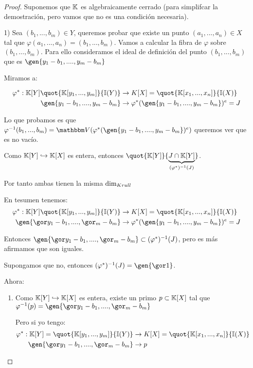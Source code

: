 \begin{proof}
	Suponemos que $\mathbb{K}$ es algebraicamente cerrado (para simplifcar la demostración, pero vamos que no es una condición necesaria).
	
	1) Sea $(b_1,...,b_m) \in Y$, queremos probar que existe un punto $(a_1,...,a_n) \in X$ tal que $\varphi(a_1,...,a_n)=(b_1,...,b_m)$. Vamos a calcular la fibra de $\varphi$ sobre $(b_1,...,b_m)$. Para ello consideramos el ideal de definición del punto $(b_1,...,b_m)$ que es $\gen{y_1-b_1,....,y_m-b_m}$
	
	Miramos a:
	
	\begin{align*}
		\varphi^*: \K[Y]  \quot{\K[y_1,...,y_m]}{\I(Y)}& \rightarrow K[X] = \quot{\K[x_1,...,x_n]}{\I(X)} \\
		\gen{y_1-b_1,....,y_m-b_m} & \rightarrow \varphi^*(\gen{y_1-b_1,....,y_m-b_m})^e=J
	\end{align*}
	
	Lo que probamos es que $\varphi^{-1}(b_1,...,b_m)= \V(\varphi^*(\gen{y_1-b_1,....,y_m-b_m})^e)$ queremos ver que es no vacío.
	
	Como $\mathbb{K}[Y] \hookrightarrow \mathbb{K}[X]$ es entera, entonces $\quot{\K[Y]}{\underbrace{J \cap \K[Y]}_{(\varphi^*)^{-1}(J)}}$.
	
	Por tanto ambas tienen la misma $\dim_{Krull}$
	
	En tesumen tenemos:
	\begin{align*}
		\varphi^*: \K[Y]  \quot{\K[y_1,...,y_m]}{\I(Y)}& \rightarrow K[X] = \quot{\K[x_1,...,x_n]}{\I(X)} \\
		\gen{\cls{y_1-b_1},....,\cls{_m-b_m}} & \rightarrow \varphi^*(\gen{y_1-b_1,....,y_m-b_m})^e=J
	\end{align*}
	
	Entonces $\gen{\cls{y_1-b_1},....,\cls{_m-b_m}} \subset (\varphi^*)^{-1}(J)$, pero es más afirmamos que son iguales.
	
	Supongamos que no, entonces $(\varphi^*)^{-1}(J)=\gen{\cls{1}}$.
	
	Ahora:
	
	\begin{enumerate}
		\item Como $\mathbb{K}[Y] \hookrightarrow \mathbb{K}[X]$ es entera, existe un primo $p \subset \mathbb{K}[X]$ tal que $\varphi^{-1}(p)=	\gen{\cls{y_1-b_1},....,\cls{_m-b_m}}$
		
		Pero si yo tengo:
		\begin{align*}
			\varphi^*: \K[Y] =  \quot{\K[y_1,...,y_m]}{\I(Y)}& \rightarrow K[X] = \quot{\K[x_1,...,x_n]}{\I(X)} \\
			\gen{\cls{y_1-b_1},....,\cls{_m-b_m}} & \rightarrow p
		\end{align*}
		

\end{enumerate}
\end{proof}
